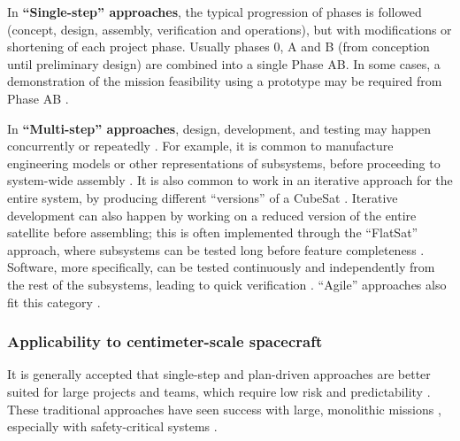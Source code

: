 \documentclass[journal,10pt]{IEEEtran}
\begin{document}
In \textbf{``Single-step'' approaches}, the typical progression of phases is followed (concept, design, assembly, verification and operations), but with modifications or shortening of each project phase. Usually phases 0, A and B (from conception until preliminary design) are combined into a single Phase AB. In some cases, a demonstration of the mission feasibility using a prototype may be required from Phase AB \autocite{lubian-arenillasNanosatelliteDevelopmentMethodology2019}.

In \textbf{``Multi-step'' approaches}, design, development, and testing may happen concurrently or repeatedly \autocite{lubian-arenillasNanosatelliteDevelopmentMethodology2019,alanaziEngineeringMethodologyStudentDriven2019,sousaCubeSatDevelopmentFramework2021}. For example, it is common to manufacture engineering models or other representations of subsystems, before proceeding to system-wide assembly \autocite{faureLeanSatellitesReliability2017}. It is also common to work in an iterative approach for the entire system, by producing different ``versions'' of a CubeSat \autocite{deckerSystemsengineeringAssessmentMultiple2016,cappaertBuildingDeployingOperating2018}. Iterative development can also happen by working on a reduced version of the entire satellite before assembling; this is often implemented through the ``FlatSat'' approach, where subsystems can be tested long before feature completeness \autocite{nasacubesatlaunchinitiativeCubeSat101Basic2017,MAIVP}. Software, more specifically, can be tested continuously and independently from the rest of the subsystems, leading to quick verification \autocite{kiesbyeHardwareInTheLoopSoftwareInTheLoopTesting2019}. ``Agile'' approaches also fit this category \autocite{labargeCubeSatAgileSystem2014,lubian-arenillasNanosatelliteDevelopmentMethodology2019,garzanitiEffectivenessScrumMethodology2019}.


\subsubsection{Applicability to centimeter-scale spacecraft}


It is generally accepted that single-step and plan-driven approaches are better suited for large projects and teams, which require low risk and predictability \autocite[Sec.~2]{boehmBalancingAgilityDiscipline2004}. These traditional approaches have seen success with large, monolithic missions \autocite{sheaNASASystemsEngineering2020, HEEAGER201822}, especially with safety-critical systems \autocite{kasauliSafetyCriticalSystemsAgile2018}.
\end{document}
